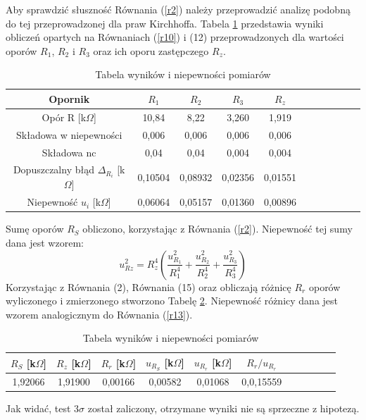 \documentclass[10pt,a4paper]{article}
\begin{document}
Aby sprawdzić słuszność Równania (\ref{r2}) należy przeprowadzić analizę podobną do tej przeprowadzonej dla praw Kirchhoffa. Tabela \ref{t10} przedstawia wyniki obliczeń opartych na Równaniach (\ref{r10}) i (12) przeprowadzonych dla wartości oporów $R_{1}$, $R_{2}$ i $R_{3}$ oraz ich oporu zastępczego $R_{z}$.

 \begin{center}
 \begin{table}[h!]
 \centering
 \caption{Tabela wyników i niepewności pomiarów}
 \label{t10}
 \begin{tabular}{|c|c|c|c|c|c|c|c|c|c|c|}
 \hline
 Opornik&$R_{1}$& $R_{2}$&$R_{3}$ &$R_{z}$ \\
 \hline
Opór R [k$\Omega$]&10,84 &8,22&3,260&1,919 \\
 \hline 
 Składowa w niepewności&0,006&0,006&0,006&0,006\\
 \hline
 Składowa nc&0,04&0,04&0,004&0,004\\
 \hline
 Dopuszczalny błąd $\Delta_{R_{i}}$ [k$\Omega$]&0,10504&0,08932&0,02356&0,01551\\
 \hline
 Niepewność $u_{i}$ [k$\Omega$] &0,06064&0,05157&0,01360&0,00896\\
 \hline
 \end{tabular}
 \end{table}
 \end{center}
Sumę oporów $R_{S}$ obliczono, korzystając z Równania (\ref{r2}). Niepewność tej sumy dana jest wzorem:
\begin{equation}
 u_{Rz}^2=R_{z}^4\left(\dfrac{u_{R_{1}}^2}{R_{1}^4}+\dfrac{u_{R_{2}}^2}{R_{2}^4}+\dfrac{u_{R_{3}}^2}{R_{3}^4}\right)
 \end{equation} 
 Korzystając z Równania (2), Równania (15) oraz obliczają różnicę $R_{r}$ oporów wyliczonego i zmierzonego stworzono Tabelę \ref{t11}. Niepewność różnicy dana jest wzorem analogicznym do Równania (\ref{r13}).
 \begin{center}
\begin{table}[h!]
 \centering
 \caption{Tabela wyników i niepewności pomiarów}
 \label{t11}
 \begin{tabular}{|c|c|c|c|c|c|c|c|c|c|c|}
 \hline
 $R_{S}$ [k$\Omega$]&$R_{z}$ [k$\Omega$]& $R_{r}$ [k$\Omega$]&$u_{R_{S}}$ [k$\Omega$] &$u_{R_{r}}$ [k$\Omega$]& $R_{r}/u_{R_{r}}$ \\
 \hline
 1,92066&1,91900&0,00166&0,00582&0,01068&0,0,15559\\
 \hline
 \end{tabular}
 \end{table}
 \end{center}
Jak widać, test $3\sigma$ został zaliczony, otrzymane wyniki nie są sprzeczne z hipotezą. 
\end{document}
